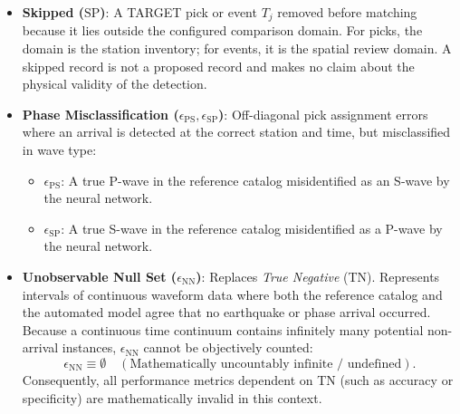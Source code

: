 \begin{itemize}
    removed before matching because it lies outside the configured
    comparison domain. For picks, the domain is the station inventory;
    for events, it is the spatial review domain. A skimmed record is not
    a missed record because the pipeline is not evaluated for that record.
  \item \textbf{Skipped ($\mathrm{SP}$)}: A TARGET pick or event $T_j$
    removed before matching because it lies outside the configured
    comparison domain. For picks, the domain is the station inventory;
    for events, it is the spatial review domain. A skipped record is not
    a proposed record and makes no claim about the physical validity of
    the detection.
  \item \textbf{Phase Misclassification ($\epsilon_{\mathrm{PS}},
    \epsilon_{\mathrm{SP}}$)}: Off-diagonal pick assignment errors
    where an arrival is detected at the correct station and time,
    but misclassified in wave type:
    \begin{itemize}
      \item $\epsilon_{\mathrm{PS}}$: A true P-wave in the reference
        catalog misidentified as an S-wave by the neural network.
      \item $\epsilon_{\mathrm{SP}}$: A true S-wave in the reference
        catalog misidentified as a P-wave by the neural network.
    \end{itemize}
  \item \textbf{Unobservable Null Set ($\epsilon_{\mathrm{NN}}$)}:
    Replaces \textit{True Negative} (\ac{TN}). Represents
    intervals of continuous waveform data where both the reference
    catalog and the automated model agree that no earthquake or
    phase arrival occurred. Because a continuous time continuum
    contains infinitely many potential non-arrival instances,
    $\epsilon_{\mathrm{NN}}$ cannot be objectively counted:
    \begin{equation}
      \epsilon_{\mathrm{NN}} \equiv \emptyset \quad
      (\text{Mathematically uncountably infinite / undefined}).
    \end{equation}
    Consequently, all performance metrics dependent on \ac{TN}
    (such as accuracy or specificity) are mathematically invalid in
    this context.
\end{itemize}

